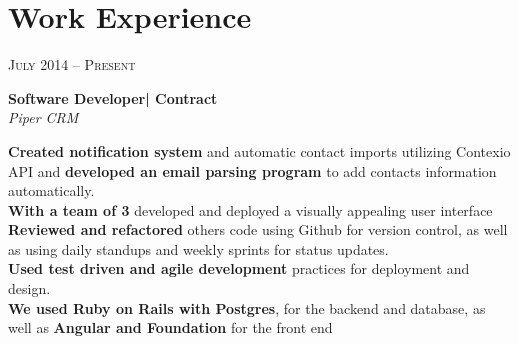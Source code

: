 \documentclass[10pt]{article} %
\begin{document}
{\begin{minipage}[t]{0.44\textwidth}






\end{minipage} %
\hfill
\begin{minipage}[t]{0.5\textwidth} %
\vspace{0pt} %


\section{Work Experience}


{\raggedleft\textsc{July 2014 -- Present}\par}

{\raggedright\large \textbf{Software Developer| Contract}\\
\textit{Piper CRM}\\[5pt]}

\normalsize{\textbf{Created notification system} and automatic contact imports utilizing Contexio API and
\textbf{developed an email parsing program} to add contacts information automatically.\\
\textbf{With a team of 3} developed and deployed a visually appealing user interface\\
\textbf{Reviewed and refactored} others code using Github for version control, as well as using daily standups and weekly sprints for status updates.\\
\textbf{Used test driven and agile development} practices for deployment and design.\\
\textbf{We used Ruby on Rails with Postgres}, for the backend and database, as well as \textbf{Angular and Foundation} for the front end
 }\\


\end{minipage}}
\end{document}
